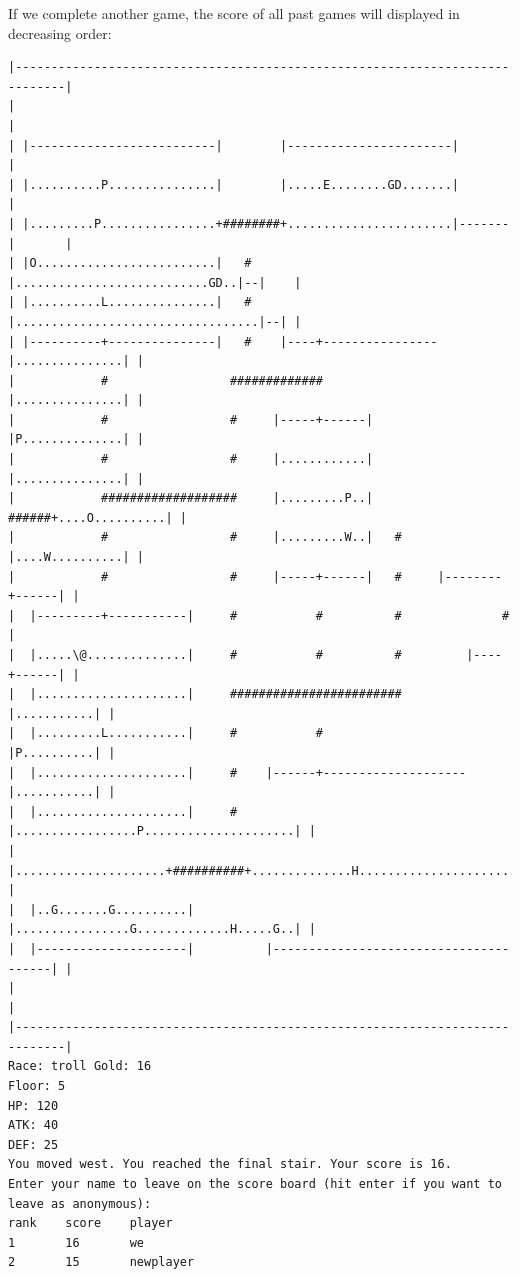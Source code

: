 \documentclass[11pt]{article}
\theoremstyle{plain}
\begin{document}
\vspace{0.2 in}
If we complete another game, the score of all past games will displayed in
decreasing order:
\begin{Verbatim}[fontsize=\scriptsize]
|-----------------------------------------------------------------------------|
|                                                                             |
| |--------------------------|        |-----------------------|               |
| |..........P...............|        |.....E........GD.......|               |
| |.........P................+########+.......................|-------|       |
| |O.........................|   #    |...........................GD..|--|    |
| |..........L...............|   #    |..................................|--| |
| |----------+---------------|   #    |----+----------------|...............| |
|            #                 #############                |...............| |
|            #                 #     |-----+------|         |P..............| |
|            #                 #     |............|         |...............| |
|            ###################     |.........P..|   ######+....O..........| |
|            #                 #     |.........W..|   #     |....W..........| |
|            #                 #     |-----+------|   #     |--------+------| |
|  |---------+-----------|     #           #          #              #        |
|  |.....\@..............|     #           #          #         |----+------| |
|  |.....................|     ########################         |...........| |
|  |.........L...........|     #           #                    |P..........| |
|  |.....................|     #    |------+--------------------|...........| |
|  |.....................|     #    |.................P.....................| |
|  |.....................+##########+..............H........................| |
|  |..G.......G..........|          |................G.............H.....G..| |
|  |---------------------|          |---------------------------------------| |
|                                                                             |
|-----------------------------------------------------------------------------|
Race: troll Gold: 16                                                   Floor: 5
HP: 120
ATK: 40
DEF: 25
You moved west. You reached the final stair. Your score is 16. 
Enter your name to leave on the score board (hit enter if you want to leave as anonymous):
rank    score    player  
1       16       we
2       15       newplayer

\end{Verbatim}
\end{document}
